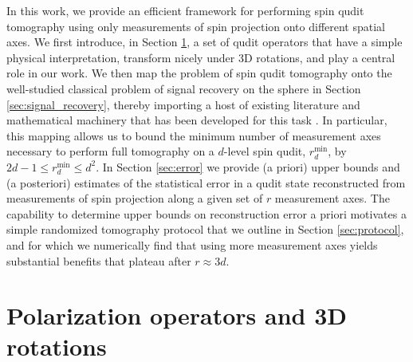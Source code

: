 \documentclass[notitlepage,twocolumn]{revtex4-2}
\renewcommand{\t}{\text} %
\begin{document}
In this work, we provide an efficient framework for performing spin qudit tomography using only measurements of spin projection onto different spatial axes.
We first introduce, in Section \ref{sec:polarization_ops}, a set of qudit operators that have a simple physical interpretation, transform nicely under 3D rotations, and play a central role in our work.
We then map the problem of spin qudit tomography onto the well-studied classical problem of signal recovery on the sphere in Section \ref{sec:signal_recovery}, thereby importing a host of existing literature and mathematical machinery that has been developed for this task \cite{mcewen2011novel, rauhut2011sparse, alem2012sparse, khalid2014optimaldimensionality}.
In particular, this mapping allows us to bound the minimum number of measurement axes necessary to perform full tomography on a $d$-level spin qudit, $r_d^{\t{min}}$, by $2d-1\le r_d^{\t{min}}\le d^2$.
In Section \ref{sec:error} we provide (a priori) upper bounds and (a posteriori) estimates of the statistical error in a qudit state reconstructed from measurements of spin projection along a given set of $r$ measurement axes.
The capability to determine upper bounds on reconstruction error a priori motivates a simple randomized tomography protocol that we outline in Section \ref{sec:protocol}, and for which we numerically find that using more measurement axes yields substantial benefits that plateau after $r\approx3d$.


\section{Polarization operators and 3D rotations}
\label{sec:polarization_ops}
\end{document}
